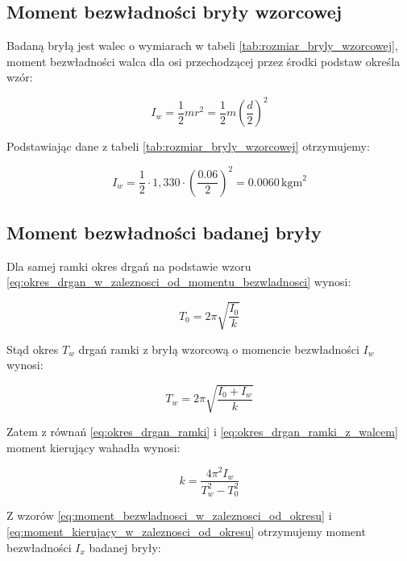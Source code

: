 \documentclass[a4paper,12pt]{article}
\begin{document}
\subsection{Moment bezwładności bryły wzorcowej}

Badaną bryłą jest walec o wymiarach w tabeli \ref{tab:rozmiar_bryly_wzorcowej}, moment bezwładności walca dla osi przechodzącej przez środki podstaw określa wzór:

\begin{equation} \label{eq:moment_bezwladnosci_walca}
    I_w = \frac{1}{2}mr^2 = \frac{1}{2}m\left(\frac{d}{2}\right)^2
\end{equation}

Podstawiając dane z tabeli \ref{tab:rozmiar_bryly_wzorcowej} otrzymujemy:

\begin{equation} \label{eq:moment_bezwladnosci_walca_wartosc}
    I_w = \frac{1}{2} \cdot 1,330 \cdot \left(\frac{0.06}{2}\right)^2 = 0.0060\,\text{kgm}^2
\end{equation}


\subsection{Moment bezwładności badanej bryły} \label{sec:moment_bezwladnosci_badanej_bryly}

Dla samej ramki okres drgań na podstawie wzoru \ref{eq:okres_drgan_w_zaleznosci_od_momentu_bezwladnosci} wynosi:

\begin{equation} \label{eq:okres_drgan_ramki}
    T_0 = 2\pi \sqrt{\frac{I_0}{k}}
\end{equation}

Stąd okres $T_w$ drgań ramki z bryłą wzorcową o momencie bezwładności $I_w$ wynosi:

\begin{equation} \label{eq:okres_drgan_ramki_z_walcem}
    T_w = 2\pi \sqrt{\frac{I_0 + I_w}{k}}
\end{equation}

Zatem z równań \eqref{eq:okres_drgan_ramki} i \eqref{eq:okres_drgan_ramki_z_walcem} moment kierujący wahadła wynosi:

\begin{equation} \label{eq:moment_kierujacy_w_zaleznosci_od_okresu}
    k = \frac{4\pi^2 I_w}{T_w^2 - T_0^2}
\end{equation}

Z wzorów \eqref{eq:moment_bezwladnosci_w_zaleznosci_od_okresu} i \eqref{eq:moment_kierujacy_w_zaleznosci_od_okresu} otrzymujemy moment bezwładności $I_x$ badanej bryły:
\end{document}
